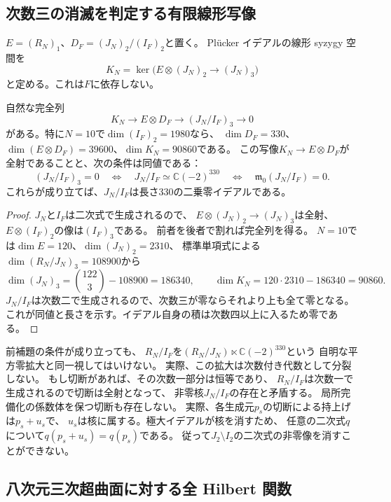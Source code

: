 \subsection{次数三の消滅を判定する有限線形写像}

$E=(R_N)_1$、$D_F=(J_N)_2/(I_F)_2$と置く。
Pl\"ucker イデアルの線形 syzygy 空間を
\[
 K_N=\ker\bigl(E\otimes(J_N)_2\longrightarrow(J_N)_3\bigr)
\]
と定める。これは$F$に依存しない。

\begin{lemma}[次数三の縮約判定]
\label{lem:nfold-cubic-syzygy-test}
自然な完全列
\[
 K_N\longrightarrow E\otimes D_F\longrightarrow(J_N/I_F)_3
 \longrightarrow0
\]
がある。特に$N=10$で$\dim(I_F)_2=1980$なら、
$\dim D_F=330$、$\dim(E\otimes D_F)=39600$、$\dim K_N=90860$である。
この写像$K_N\to E\otimes D_F$が全射であることと、次の条件は同値である：
\[
 (J_N/I_F)_3=0
 \quad\Longleftrightarrow\quad
 J_N/I_F\simeq \mathbb C(-2)^{330}
 \quad\Longleftrightarrow\quad
 \mathfrak m_0(J_N/I_F)=0.
\]
これらが成り立てば、$J_N/I_F$は長さ330の二乗零イデアルである。
\end{lemma}
\begin{proof}
$J_N$と$I_F$は二次式で生成されるので、
$E\otimes(J_N)_2\to(J_N)_3$は全射、
$E\otimes(I_F)_2$の像は$(I_F)_3$である。
前者を後者で割れば完全列を得る。
$N=10$では$\dim E=120$、$\dim(J_N)_2=2310$、
標準単項式による$\dim(R_N/J_N)_3=108900$から
\[
 \dim(J_N)_3=\binom{122}{3}-108900=186340,
 \qquad \dim K_N=120\cdot2310-186340=90860.
\]
$J_N/I_F$は次数二で生成されるので、次数三が零ならそれより上も全て零となる。
これが同値と長さを示す。イデアル自身の積は次数四以上に入るため零である。
\end{proof}

\begin{remark}[非自明な平方零拡大]
前補題の条件が成り立っても、
$R_N/I_F$を$(R_N/J_N)\ltimes\mathbb C(-2)^{330}$という
自明な平方零拡大と同一視してはいけない。
実際、この拡大は次数付き代数として分裂しない。
もし切断があれば、その次数一部分は恒等であり、
$R_N/I_F$は次数一で生成されるので切断は全射となって、
非零核$J_N/I_F$の存在と矛盾する。
局所完備化の係数体を保つ切断も存在しない。
実際、各生成元$p_s$の切断による持上げは$p_s+u_s$で、
$u_s$は核に属する。極大イデアルが核を消すため、
任意の二次式$q$について$q(p_s+u_s)=q(p_s)$である。
従って$J_2\setminus I_2$の二次式の非零像を消すことができない。
\end{remark}

\subsection{八次元三次超曲面に対する全 Hilbert 関数}

